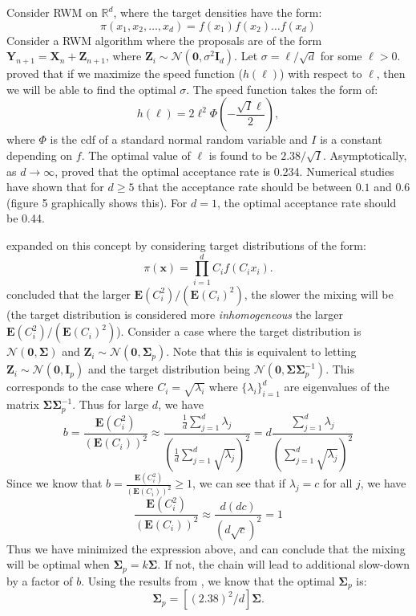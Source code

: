 \documentclass[twoside]{article}
\begin{document}
Consider RWM on $\mathbb{R}^d$, where the target densities have the form:
\begin{equation}
\pi(x_1, x_2, \dots, x_d) = f(x_1) f(x_2)\dots f(x_d)
\label{eq3}
\end{equation}
Consider a RWM algorithm where the proposals are of the form $\mathbf{Y}_{n+1} = \mathbf{X}_n + \mathbf{Z}_{n+1}$, where $\mathbf{Z}_i\sim \mathcal{N}(\mathbf{0}, \sigma^2 \mathbf{I}_d)$. Let $\sigma = \ell/\sqrt{d}$ for some $\ell > 0$.  \citet{gelman1997weak}  proved that if we maximize the speed function ($h(\ell)$) with respect to $\ell$, then we will be able to find the optimal $\sigma$. The speed function takes the form of:
$$h(\ell) = 2\ell^2\Phi\left(-\frac{\sqrt{I}\ell}{2}\right),$$ where $\Phi$ is the cdf of a standard normal random variable and $I$ is a constant depending on $f$. The optimal value of $\ell$ is found to be $2.38/ \sqrt{I}$. Asymptotically, as $d \rightarrow \infty$, \citet{gelman1997weak} proved that the optimal acceptance rate is 0.234. Numerical studies have shown that for $d \ge 5$ that the acceptance rate should be between $0.1$ and $0.6$ (figure 5 graphically shows this). For $d =1$, the optimal acceptance rate should be 0.44.

\citet{roberts2001optimal} expanded on this concept by considering target distributions of the form:
\begin{equation}
\pi(\mathbf{x}) = \prod_{i=1}^d C_if(C_ix_i).
\label{eq4}
\end{equation}
\citet{roberts2001optimal} concluded that the larger $\mathbf{E}(C_i^2)/ (\mathbf{E}(C_i)^2)$, the slower the mixing will be (the target distribution is considered more \textit{inhomogeneous} the larger $\mathbf{E}(C_i^2)/ (\mathbf{E}(C_i)^2)$). Consider a case where the target distribution is $\mathcal{N}(\mathbf{0}, \boldsymbol{\Sigma})$ and $\mathbf{Z}_i \sim \mathcal{N}(\mathbf{0}, \boldsymbol{\Sigma}_p)$. Note that this is equivalent to letting $\mathbf{Z}_i \sim \mathcal{N}(\mathbf{0}, \mathbf{I}_p)$ and the target distribution being $\mathcal{N}(\mathbf{0}, \boldsymbol{\Sigma}\boldsymbol{\Sigma}^{-1}_p)$. This corresponds to the case where $C_i = \sqrt{\lambda_i}$ where $\{\lambda_i\}_{i=1}^d$ are eigenvalues of the matrix $\boldsymbol{\Sigma}\boldsymbol{\Sigma}_p^{-1}$. Thus for large $d$, we have
$$b = \frac{\mathbf{E}(C_i^2)}{(\mathbf{E}(C_i))^2} \approx \frac{\frac{1}{d}\sum_{j=1}^d \lambda_j}{\left(\frac{1}{d}\sum_{j=1}^d \sqrt{\lambda_j} \right)^2} = d \frac{\sum_{j=1}^d \lambda_j}{\left(\sum_{j=1}^d \sqrt{\lambda_j} \right)^2}$$
Since we know that $b =\frac{\mathbf{E}(C_i^2)}{(\mathbf{E}(C_i))^2} \ge 1$, we can see that if $\lambda_j = c$ for all $j$, we have
$$\frac{\mathbf{E}(C_i^2)}{(\mathbf{E}(C_i))^2} \approx  \frac{d (dc)}{\left(d\sqrt{c} \right)^2} = 1$$ 
Thus we have minimized the expression above, and can conclude that the mixing will be optimal when  $\boldsymbol{\Sigma}_p = k\boldsymbol{\Sigma}$. If not, the chain will lead to additional slow-down by a factor of $b$. Using the results from \citet{gelman1997weak}, we know that the optimal $\boldsymbol{\Sigma}_p$ is:
$$\boldsymbol{\Sigma}_p = [(2.38)^2/d]\boldsymbol{\Sigma}.$$
\end{document}
